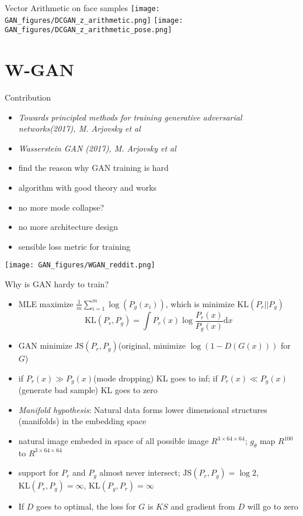 \documentclass[9pt]{beamer}
\newcommand{\mathd}{\mathrm{d}}
\begin{document}
\begin{frame}{ Vector Arithmetic on face samples}
  \texttt{[image: GAN\_figures/DCGAN\_z\_arithmetic.png]}
  \texttt{[image: GAN\_figures/DCGAN\_z\_arithmetic\_pose.png]}
\end{frame}

\section{W-GAN}

\begin{frame}{Contribution}
  \begin{itemize}
    \item \emph{Towards principled methods for training generative adversarial networks(2017), M. Arjovsky et al}
    \item \emph{Wasserstein GAN (2017), M. Arjovsky et al}
    \item find the reason why GAN training is hard
    \item algorithm with good theory and works
    \item no more mode collapse?
    \item no more architecture design
    \item sensible loss metric for training
  \end{itemize}
  \texttt{[image: GAN\_figures/WGAN\_reddit.png]}
\end{frame}

\begin{frame}{Why is GAN hardy to train?}
  \begin{itemize}
  \item MLE maximize $\frac{1}{m} \sum_{i = 1}^m \log (P_g (x_i))$, which is minimize $\text{KL}(P_r||P_g)$
  \[ \text{KL} (P_r, P_g) = \int P_r (x) \log \frac{P_r (x)}{P_g (x)} \mathd x
\]
  \item GAN minimize $\text{JS}(P_r, P_g)$(original, minimize $\log(1-D(G(x)))$ for $G$)
  \item if $P_r(x)\gg P_g(x)$(mode dropping) KL goes to inf; if $P_r(x)\ll P_g(x)$(generate bad sample) KL goes to zero
  \item \emph{Manifold hypothesis}: Natural data forms lower
    dimensional structures (manifolds) in the embedding space
  \item natural image embeded in space of all possible image $R^{3\times 64\times64}$; $g_\theta$ map $R^{100}$ to $R^{3\times 64\times64}$
  \item support for $P_r$ and $P_g$ almost never intersect;
    $\text{JS}(P_r,P_g)=\log{2}$, $\text{KL}(P_r, P_g)=\infty$,
    $\text{KL}(P_g, P_r)=\infty$
  \item If $D$ goes to optimal, the loss for $G$ is $KS$ and
    gradient from $D$ will go to zero
  \end{itemize}
\end{frame}
\end{document}

